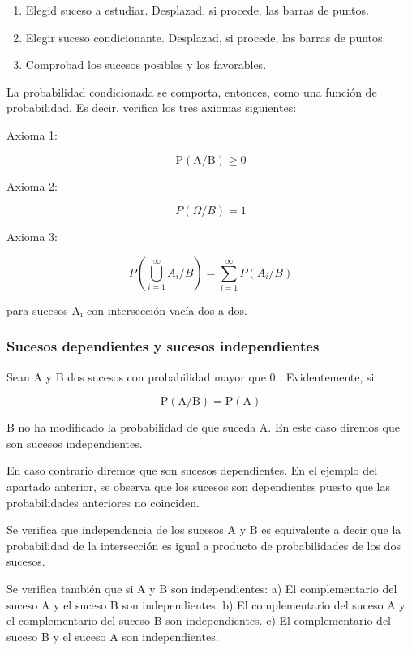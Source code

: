\documentclass[
]{article}
\providecommand{\tightlist}{%
  \setlength{\itemsep}{0pt}\setlength{\parskip}{0pt}}
\begin{document}
\begin{enumerate}
\def\labelenumi{\arabic{enumi})}
\tightlist
\item
  Elegid suceso a estudiar. Desplazad, si procede, las barras de
  puntos.
\item
  Elegir suceso condicionante. Desplazad, si procede, las barras de
  puntos.
\item
  Comprobad los sucesos posibles y los favorables.
\end{enumerate}

La probabilidad condicionada se comporta, entonces, como una función de
probabilidad. Es decir, verifica los tres axiomas siguientes:

Axioma 1:

\[
\mathrm{P}(\mathrm{A} / \mathrm{B}) \geq 0
\]

Axioma 2:

\[
P(\Omega / B)=1
\]

Axioma 3:

\[
P\left(\bigcup_{i=1}^{\infty} A_{i} / B\right)=\sum_{i=1}^{\infty} P\left(A_{i} / B\right)
\]

para sucesos \(\mathrm{A}_{\mathrm{i}}\) con intersección vacía dos a dos.

\subsubsection{Sucesos dependientes y sucesos independientes}\label{sucesos-dependientes-y-sucesos-independientes}

Sean A y B dos sucesos con probabilidad mayor que 0 . Evidentemente, si

\[
\mathrm{P}(\mathrm{A} / \mathrm{B})=\mathrm{P}(\mathrm{A})
\]

B no ha modificado la probabilidad de que suceda A. En este caso diremos
que son sucesos independientes.

En caso contrario diremos que son sucesos dependientes. En el ejemplo
del apartado anterior, se observa que los sucesos son dependientes
puesto que las probabilidades anteriores no coinciden.

Se verifica que independencia de los sucesos A y B es equivalente a
decir que la probabilidad de la intersección es igual a producto de
probabilidades de los dos sucesos.

Se verifica también que si A y B son independientes: a) El
complementario del suceso A y el suceso B son independientes. b) El
complementario del suceso A y el complementario del suceso B son
independientes. c) El complementario del suceso B y el suceso A son
independientes.
\end{document}
